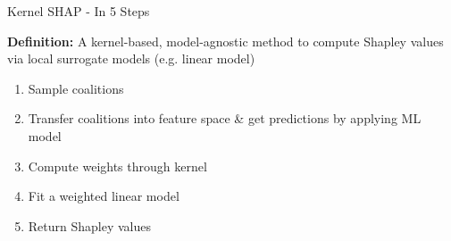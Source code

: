 \documentclass[11pt,compress,t,notes=noshow, aspectratio=169, xcolor=table]{beamer}
\begin{document}
\begin{vbframe}{Kernel SHAP - In 5 Steps}

\textbf{Definition:} A kernel-based, model-agnostic method to compute Shapley values via local surrogate models (e.g. linear model)\\
\vspace{1cm}
\begin{enumerate}
    \item Sample coalitions 
    
    \item Transfer coalitions into feature space \& get predictions by applying ML model
    
    
    \item Compute weights through kernel
    
    \item Fit a weighted linear model 

    \item Return Shapley values
    
    
\end{enumerate}

\end{vbframe}
\end{document}

